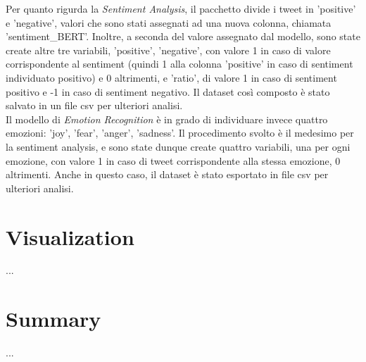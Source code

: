 \documentclass[12pt,journal,compsoc]{IEEEtran}
\begin{document}


Per quanto rigurda la \textit{Sentiment Analysis}, il pacchetto divide i tweet in 'positive' e 'negative', valori che sono stati assegnati ad una nuova colonna, chiamata 'sentiment\_BERT'. Inoltre, a seconda del valore assegnato dal modello, sono state create altre tre variabili, 'positive', 'negative', con valore 1 in caso di valore corrispondente al sentiment (quindi 1 alla colonna 'positive' in caso di sentiment individuato positivo) e 0 altrimenti, e 'ratio', di valore 1 in caso di sentiment positivo e -1 in caso di sentiment negativo. Il dataset così composto è stato salvato in un file csv per ulteriori analisi.\\
Il modello di \textit{Emotion Recognition} è in grado di individuare invece quattro emozioni: 'joy', 'fear', 'anger', 'sadness'. Il procedimento svolto è il medesimo per la sentiment analysis, e sono state dunque create quattro variabili, una per ogni emozione, con valore 1 in caso di tweet corrispondente alla stessa emozione, 0 altrimenti. Anche in questo caso, il dataset è stato esportato in file csv per ulteriori analisi.

\section{Visualization}
...

\section{Summary}
...




\nocite{*}
\printbibliography
\end{document}
